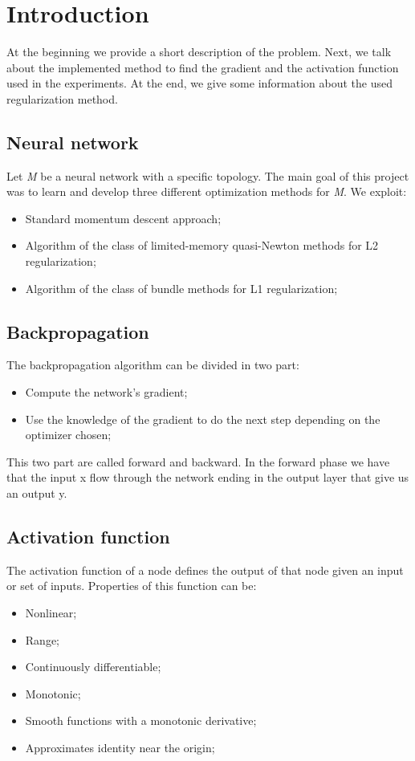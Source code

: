 \section{Introduction}
At the beginning we provide a short description of the problem. Next, we talk about the implemented method to find the gradient and the activation function used in the experiments. At the end, we give some information about the used regularization method.
\subsection{Neural network}
Let \textit{M} be a neural network with a specific topology. The main goal of this project was to learn and develop three different optimization methods for \textit{M}. We exploit:
\begin{itemize}
	\item Standard momentum descent approach;
	\item Algorithm of the class of limited-memory quasi-Newton methods for L2 regularization;
	\item Algorithm of the class of bundle methods for L1 regularization;
\end{itemize}
\subsection{Backpropagation}
The backpropagation algorithm can be divided in two part:
\begin{itemize}
	\item Compute the network's gradient;
	\item Use the knowledge of the gradient to do the next step depending on the optimizer chosen;
\end{itemize}
This two part are called forward and backward.
In the forward phase we have that the input x flow through the network ending in the output layer that give us an output y.
\subsection{Activation function}
\label{activationFunction}
The activation function of a node defines the output of that node given an input or set of inputs. 
Properties of this function can be:
\begin{itemize}
	\item Nonlinear;
	\item Range;
	\item Continuously differentiable;
	\item Monotonic;
	\item Smooth functions with a monotonic derivative;
	\item Approximates identity near the origin;
\end{itemize}

